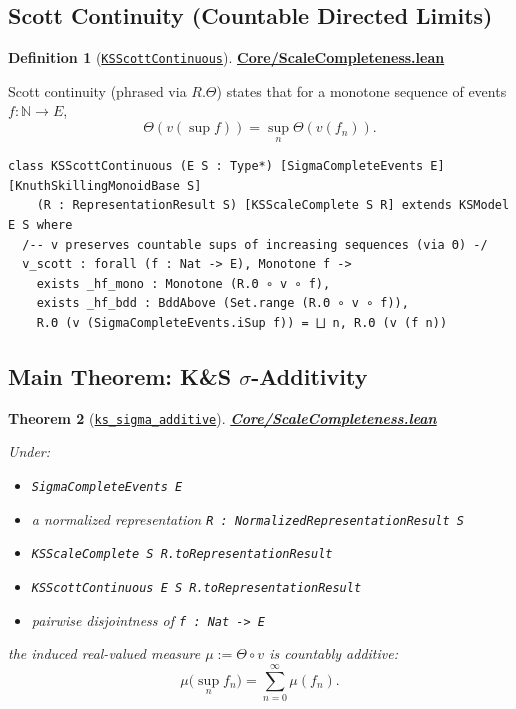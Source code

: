\documentclass[11pt]{article}
\newtheorem{theorem}{Theorem}[section]
\theoremstyle{definition}
\newtheorem{definition}[theorem]{Definition}
\theoremstyle{remark}
\begin{document}
\subsection{Scott Continuity (Countable Directed Limits)}

\begin{definition}[\href{https://github.com/zariuq/ks-foundations-of-inference/blob/main/KnuthSkilling/Core/ScaleCompleteness.lean}{\texttt{KSScottContinuous}}]
\textbf{\href{https://github.com/zariuq/ks-foundations-of-inference/blob/main/KnuthSkilling/Core/ScaleCompleteness.lean}{Core/ScaleCompleteness.lean}}

Scott continuity (phrased via $R.\Theta$) states that for a monotone sequence of events $f : \mathbb{N} \to E$,
\[
\Theta(v(\sup f)) = \sup_n \Theta(v(f_n)).
\]
\end{definition}

\begin{lstlisting}[caption={Scott continuity for valuations}]
class KSScottContinuous (E S : Type*) [SigmaCompleteEvents E] [KnuthSkillingMonoidBase S]
    (R : RepresentationResult S) [KSScaleComplete S R] extends KSModel E S where
  /-- v preserves countable sups of increasing sequences (via Θ) -/
  v_scott : forall (f : Nat -> E), Monotone f ->
    exists _hf_mono : Monotone (R.Θ ∘ v ∘ f),
    exists _hf_bdd : BddAbove (Set.range (R.Θ ∘ v ∘ f)),
    R.Θ (v (SigmaCompleteEvents.iSup f)) = ⨆ n, R.Θ (v (f n))
\end{lstlisting}

\subsection{Main Theorem: K\&S $\sigma$-Additivity}

\begin{theorem}[\href{https://github.com/zariuq/ks-foundations-of-inference/blob/main/KnuthSkilling/Core/ScaleCompleteness.lean}{\texttt{ks\_sigma\_additive}}]
\textbf{\href{https://github.com/zariuq/ks-foundations-of-inference/blob/main/KnuthSkilling/Core/ScaleCompleteness.lean}{Core/ScaleCompleteness.lean}}

Under:
\begin{itemize}
\item \texttt{SigmaCompleteEvents E}
\item a normalized representation \texttt{R : NormalizedRepresentationResult S}
\item \texttt{KSScaleComplete S R.toRepresentationResult}
\item \texttt{KSScottContinuous E S R.toRepresentationResult}
\item pairwise disjointness of \texttt{f : Nat -> E}
\end{itemize}
the induced real-valued measure $\mu := \Theta \circ v$ is countably additive:
\[
\mu\Big(\sup_n f_n\Big) = \sum_{n=0}^\infty \mu(f_n).
\]
\end{theorem}
\end{document}
